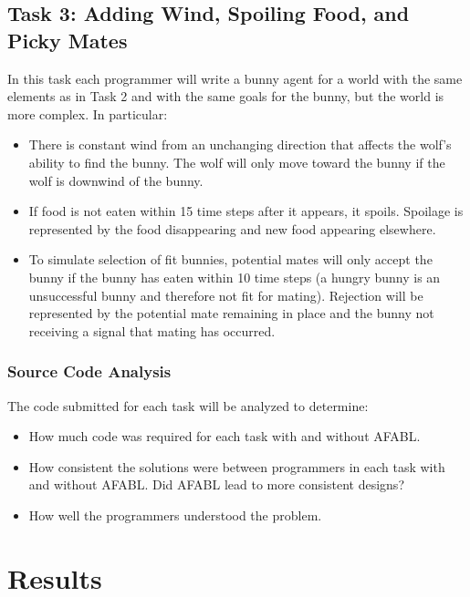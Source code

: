 \subsection{Task 3: Adding Wind, Spoiling Food, and Picky Mates}\label{sec:task3}

In this task each programmer will write a bunny agent for a world with the same elements as in Task 2 and with the same goals for the bunny, but the world is more complex.  In particular:

\begin{itemize}

\item There is constant wind from an unchanging direction that affects the wolf's ability to find the bunny.  The wolf will only move toward the bunny if the wolf is downwind of the bunny.

\item If food is not eaten within 15 time steps after it appears, it spoils.  Spoilage is represented by the food disappearing and new food appearing elsewhere.

\item To simulate selection of fit bunnies, potential mates will only accept the bunny if the bunny has eaten within 10 time steps (a hungry bunny is an unsuccessful bunny and therefore not fit for mating).  Rejection will be represented by the potential mate remaining in place and the bunny not receiving a signal that mating has occurred.

\end{itemize}


\subsubsection{Source Code Analysis}

The code submitted for each task will be analyzed to determine:

\begin{itemize}
\item How much code was required for each task with and without AFABL.
\item How consistent the solutions were between programmers in each task with and without AFABL.  Did AFABL lead to more consistent designs?
\item How well the programmers understood the problem.
\end{itemize}

\section{Results}

